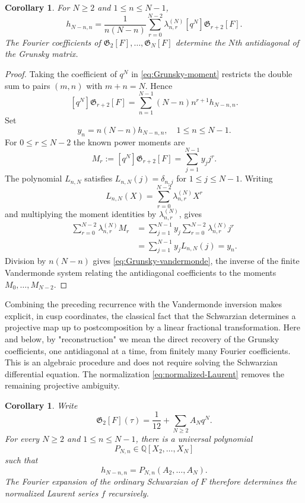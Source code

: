 \documentclass[11pt]{amsart}
\newtheorem{cor}[thm]{Corollary}
\theoremstyle{definition}
\theoremstyle{remark}
\numberwithin{equation}{section}
\begin{document}
\begin{cor}\label{cor:Grunsky-vandermonde}
For $N\geq2$ and $1\leq n\leq N-1$,
\begin{equation}\label{eq:Grunsky-vandermonde}
h_{N-n,n}
=
\frac1{n(N-n)}
\sum_{r=0}^{N-2}\lambda_{n,r}^{(N)}
[q^N]\mathfrak G_{r+2}[F].
\end{equation}
The Fourier coefficients of $\mathfrak G_2[F],\ldots,\mathfrak G_N[F]$ determine the $N$th antidiagonal of the Grunsky matrix.
\end{cor}

\begin{proof}
Taking the coefficient of $q^N$ in \eqref{eq:Grunsky-moment} restricts the double sum to pairs $(m,n)$ with $m+n=N$. Hence
\[
[q^N]\mathfrak G_{r+2}[F]
=
\sum_{n=1}^{N-1}(N-n)n^{r+1}h_{N-n,n}.
\]
Set
\[
y_n=n(N-n)h_{N-n,n},
\quad 1\leq n\leq N-1.
\]
For $0\leq r\leq N-2$ the known power moments are
\[
M_r:=[q^N]\mathfrak G_{r+2}[F]
=\sum_{j=1}^{N-1}y_jj^r.
\]
The polynomial $L_{n,N}$ satisfies $L_{n,N}(j)=\delta_{n,j}$ for $1\leq j\leq N-1$. Writing
\[
L_{n,N}(X)=\sum_{r=0}^{N-2}\lambda_{n,r}^{(N)}X^r
\]
and multiplying the moment identities by $\lambda_{n,r}^{(N)}$, gives
\begin{align*}
\sum_{r=0}^{N-2}\lambda_{n,r}^{(N)}M_r
&=\sum_{j=1}^{N-1}y_j
  \sum_{r=0}^{N-2}\lambda_{n,r}^{(N)}j^r\\
&=\sum_{j=1}^{N-1}y_jL_{n,N}(j)=y_n.
\end{align*}
Division by $n(N-n)$ gives \eqref{eq:Grunsky-vandermonde}, the inverse of the finite Vandermonde system relating the antidiagonal coefficients to the moments $M_0,\ldots,M_{N-2}$.
\end{proof}

Combining the preceding recurrence with the Vandermonde inversion makes explicit, in cusp coordinates, the classical fact that the Schwarzian determines a projective map up to postcomposition by a linear fractional transformation. Here and below, by "reconstruction" we mean the direct recovery of the Grunsky coefficients, one antidiagonal at a time, from finitely many Fourier coefficients. This is an algebraic procedure and does not require solving the Schwarzian differential equation. The normalization \eqref{eq:normalized-Laurent} removes the remaining projective ambiguity.

\begin{cor}\label{cor:Schwarzian-Grunsky-reconstruction}
Write
\begin{equation*}
\mathfrak G_2[F](\tau)=\frac1{12}+\sum_{N\geq2}A_Nq^N.
\end{equation*}
For every $N\geq2$ and $1\leq n\leq N-1$, there is a universal polynomial
\[
P_{N,n}\in\mathbb Q[X_2,\ldots,X_N]
\]
such that
\begin{equation}\label{eq:universal-Grunsky-reconstruction}
h_{N-n,n}=P_{N,n}(A_2,\ldots,A_N).
\end{equation}
The Fourier expansion of the ordinary Schwarzian of $F$ therefore determines the normalized Laurent series $f$ recursively.
\end{cor}
\end{document}
